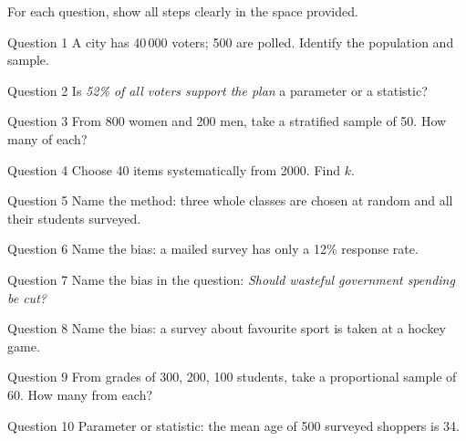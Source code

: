 \documentclass[11pt]{article}
\begin{document}
\clearpage
{}
For each question, show all steps clearly in the space provided.

\begin{qbox}{Question 1}
A city has 40\,000 voters; 500 are polled. Identify the population and sample.\workspace{2.4cm}
\end{qbox}

\begin{qbox}{Question 2}
Is \emph{52\% of all voters support the plan} a parameter or a statistic?\workspace{2.4cm}
\end{qbox}

\begin{qbox}{Question 3}
From 800 women and 200 men, take a stratified sample of 50. How many of each?\workspace{2.4cm}
\end{qbox}

\begin{qbox}{Question 4}
Choose 40 items systematically from 2000. Find $k$.\workspace{2.4cm}
\end{qbox}

\begin{qbox}{Question 5}
Name the method: three whole classes are chosen at random and all their students surveyed.\workspace{2.4cm}
\end{qbox}

\begin{qbox}{Question 6}
Name the bias: a mailed survey has only a 12\% response rate.\workspace{2.4cm}
\end{qbox}

\begin{qbox}{Question 7}
Name the bias in the question: \emph{Should wasteful government spending be cut?}\workspace{2.4cm}
\end{qbox}

\begin{qbox}{Question 8}
Name the bias: a survey about favourite sport is taken at a hockey game.\workspace{2.4cm}
\end{qbox}

\begin{qbox}{Question 9}
From grades of 300, 200, 100 students, take a proportional sample of 60. How many from each?\workspace{2.4cm}
\end{qbox}

\begin{qbox}{Question 10}
Parameter or statistic: the mean age of 500 surveyed shoppers is 34.\workspace{2.4cm}
\end{qbox}
\end{document}
